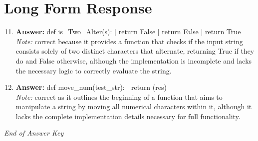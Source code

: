 \documentclass[12pt]{article}
\begin{document}
\section*{Long Form Response}
\begin{enumerate}[label=\arabic*.]
\setcounter{enumi}{10}
\item \textbf{Answer:} def is\_Two\_Alter(s): | return False | return False | return True
\\ \textit{Note:} correct because it provides a function that checks if the input string consists solely of two distinct characters that alternate, returning True if they do and False otherwise, although the implementation is incomplete and lacks the necessary logic to correctly evaluate the string.
\item \textbf{Answer:} def move\_num(test\_str): | return (res)
\\ \textit{Note:} correct as it outlines the beginning of a function that aims to manipulate a string by moving all numerical characters within it, although it lacks the complete implementation details necessary for full functionality.
\end{enumerate}

\vfill
\noindent\textit{End of Answer Key}
\end{document}
